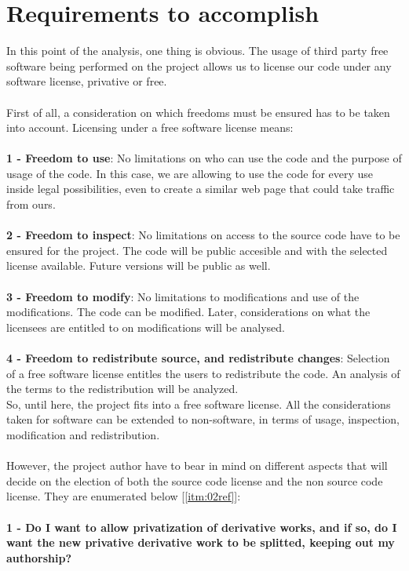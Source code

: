 \documentclass[11pt]{article}
\begin{document}
\section{Requirements to accomplish}

In this point of the analysis, one thing is obvious. The usage of third party free software being performed on the project allows us to license our code under any software license, privative or free.\\
\\
First of all, a consideration on which freedoms must be ensured has to be taken into account. Licensing under a free software license means:\\
\\
\textbf{1 - Freedom to use}: No limitations on who can use the code and the purpose of usage of the code. In this case, we are allowing to use the code for every use inside legal possibilities, even to create a similar web page that could take traffic from ours.\\
\\
\textbf{2 - Freedom to inspect}: No limitations on access to the source code have to be ensured for the project. The code will be public accesible and with the selected license available. Future versions will be public as well.\\
\\
\textbf{3 - Freedom to modify}: No limitations to modifications and use of the modifications. The code can be modified. Later, considerations on what the licensees are entitled to on modifications will be analysed.\\
\\
\textbf{4 - Freedom to redistribute source, and redistribute changes}: Selection of a free software license entitles the users to redistribute the code. An analysis of the terms to the redistribution will be analyzed.\\
So, until here, the project fits into a free software license. All the considerations taken for software can be extended to non-software, in terms of usage, inspection, modification and redistribution.\\
\\
However, the project author have to bear in mind on different aspects that will decide on the election of both the source code license and the non source code license. They are enumerated below [\ref{itm:02ref}]:\\
\\
\textbf{1 - Do I want to allow privatization of derivative works, and if so, do I want the new privative derivative work to be splitted, keeping out my authorship?}\\
\end{document}
